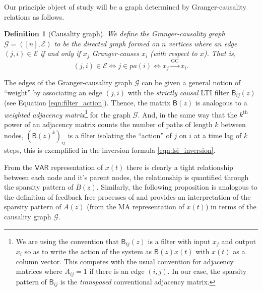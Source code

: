 \documentclass{statsoc}
\def\gc{\overset{\text{GC}}{\rightarrow}}  %
\def\gcg{\mathcal{G}}  %
\def\gcge{\mathcal{E}}  %
\def\VAR{\mathsf{VAR}}  %
\def\B{\mathsf{B}}  %
\newcommand{\pa}[1]{pa(#1)}  %
\newtheorem{definition}{Definition}
\begin{document}
Our principle object of study will be a graph determined by
Granger-causality relations as follows.

\begin{definition}[Causality graph]
  We define the Granger-causality graph $\gcg = ([n], \gcge)$ to be the directed
  graph formed on $n$ vertices where an edge $(j, i) \in \gcge$ if and
  only if $x_j$ Granger-causes $x_i$ (with respect to $x$).  That is,
  $$(j, i) \in \gcge \iff j \in \pa{i} \iff x_j \gc x_i.$$
\end{definition}

The edges of the Granger-causality graph $\gcg$ can be given a general
notion of ``weight'' by associating an edge $(j, i)$ with the
\textit{strictly causal} LTI filter $\B_{ij}(z)$ (see Equation
\eqref{eqn:filter_action}).  Thence, the matrix $\B(z)$ is analogous
to a \textit{weighted adjacency matrix}\footnote{\footnotesize We are using the
  convention that $\B_{ij}(z)$ is a filter with input $x_j$ and output
  $x_i$ so as to write the action of the system as $\B(z)x(t)$ with
  $x(t)$ as a column vector.  This competes with the usual convention
  for adjacency matrices where $A_{ij} = 1$ if there is an edge
  $(i, j)$.  In our case, the sparsity pattern of $\B_{ij}$ is the
  \textit{transposed} conventional adjacency matrix.} for the graph $\gcg$.  And,
in the same way that the $k^{\text{th}}$ power of an adjacency matrix
counts the number of paths of length $k$ between nodes,
$(\B(z)^k)_{ij}$ is a filter isolating the ``action'' of $j$ on $i$ at
a time lag of $k$ steps, this is exemplified in the inversion formula
\eqref{eqn:lsi_inversion}.

From the $\VAR$ representation of $x(t)$ there is clearly a tight
relationship between each node and it's parent nodes, the relationship
is quantified through the sparsity pattern of $B(z)$.  Similarly, the
following proposition is analogous to the definition of feedback free
processes of \cite{caines1975feedback} and provides an interpretation
of the sparsity pattern of $A(z)$ (from the MA representation of
$x(t)$) in terms of the causality graph $\gcg$.
\end{document}
